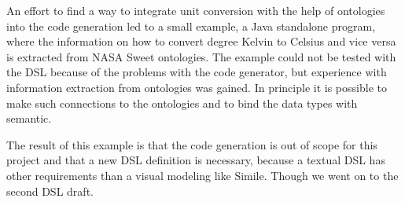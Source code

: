 \par
An effort to find a way to integrate unit conversion with the help of ontologies into the code generation led to a small example, a Java standalone program, where the information on how to convert degree Kelvin to Celsius and vice versa is extracted from NASA Sweet ontologies. The example could not be tested with the DSL because of the problems with the code generator, but experience with information extraction from ontologies was gained. In principle it is possible to make such connections to the ontologies and to bind the data types with semantic. 
\par
The result of this example is that the code generation is out of scope for this project and that a new DSL definition is necessary, because a textual DSL has other requirements than a visual modeling like Simile. Though we went on to the second DSL draft.


